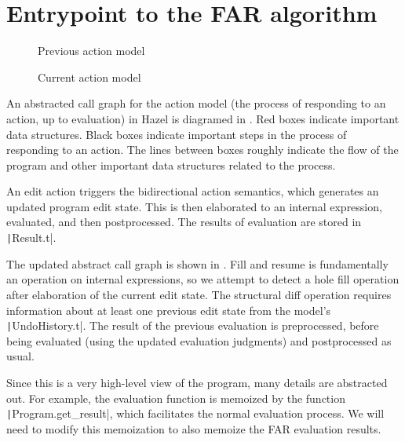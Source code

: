 
\section{Entrypoint to the FAR algorithm}
\label{sec:far-entrypoint}

\begin{figure}
  \centering
  
  \caption{Previous action model}
  \label{fig:prev-evaluation-call-graph}
\end{figure}

\begin{figure}
  \centering
  
  \caption{Current action model}
  \label{fig:current-evaluation-call-graph}
\end{figure}

An abstracted call graph for the action model (the process of responding to an action, up to evaluation) in Hazel is diagramed in . Red boxes indicate important data structures. Black boxes indicate important steps in the process of responding to an action. The lines between boxes roughly indicate the flow of the program and other important data structures related to the process.

An edit action triggers the bidirectional action semantics, which generates an updated program edit state. This is then elaborated to an internal expression, evaluated, and then postprocessed. The results of evaluation are stored in \texttt|Result.t|.

The updated abstract call graph is shown in . Fill and resume is fundamentally an operation on internal expressions, so we attempt to detect a hole fill operation after elaboration of the current edit state. The structural diff operation requires information about at least one previous edit state from the model's \texttt|UndoHistory.t|. The result of the previous evaluation is preprocessed, before being evaluated (using the updated evaluation judgments) and postprocessed as usual.

Since this is a very high-level view of the program, many details are abstracted out. For example, the evaluation function is memoized by the function \texttt|Program.get_result|, which facilitates the normal evaluation process. We will need to modify this memoization to also memoize the FAR evaluation results.

